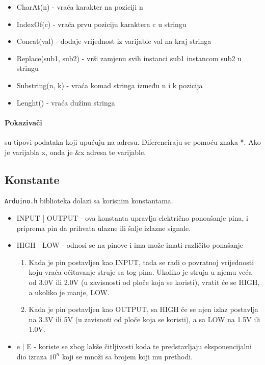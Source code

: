\documentclass[../Document.tex]{subfiles}
\begin{document}
\begin{itemize}
  \item CharAt(n) - vraća karakter na poziciji n
  \item IndexOf(c) - vraća prvu poziciju karaktera c u stringu
  \item Concat(val) - dodaje vrijednost iz varijable val na kraj stringa
  \item Replace(sub1, sub2) - vrši zamjenu svih instanci sub1 instancom sub2 u stringu
  \item Substring(n, k) - vraća komad stringa između n i k pozicija
  \item Lenght() - vraća dužinu stringa
\end{itemize}

\paragraph{Pokazivači} su tipovi podataka koji upućuju na adresu. Diferenciraju se pomoću znaka *. Ako je varijabla x, onda je \&x adresa te varijable.

\subsection{Konstante}

\verb|Arduino.h| biblioteka dolazi sa korisnim konstantama\cite{arduinoConst}.

\begin{itemize}
  \item INPUT | OUTPUT - ova konstanta upravlja električno ponoašanje pina, i priprema pin da prihvata ulazne ili šalje izlazne signale.
  \item HIGH | LOW - odnosi se na pinove i ima može imati različito ponašanje
        \begin{enumerate}
          \item Kada je pin postavljen kao INPUT, tada se radi o povratnoj vrijednosti koju vraća očitavanje struje sa tog pina. Ukoliko je struja u njemu veća od 3.0V ili 2.0V (u zavisnosti od ploče koja se koristi), vratit će se HIGH, a ukoliko je manje, LOW.
          \item Kada je pin postavljen kao OUTPUT, sa HIGH će se njen izlaz postavlja na 3.3V ili 5V (u zavisnoti od ploče koja se koristi), a sa LOW na 1.5V ili 1.0V.
        \end{enumerate}
  \item e | E - koriste se zbog lakše čitljivosti koda te predstavljaju eksponencijalni dio izraza $10^n$ koji se množi sa brojem koji mu prethodi.
\end{itemize}
\end{document}
